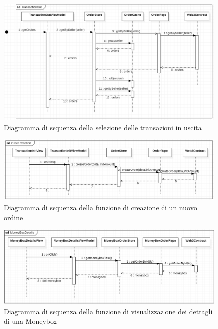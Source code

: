 \begin{landscape}
    \begin{figure}[H]
        \begin{center}
        \includegraphics[scale=0.7]{immagini/TransactionOut.png}
        \caption{Diagramma di sequenza della selezione delle transazioni in uscita}
        \end{center}
    \end{figure}
\end{landscape}

\begin{figure}[H]
    \begin{center}
    \includegraphics[width=\textwidth]{immagini/ordercreation.png}
    \caption{Diagramma di sequenza della funzione di creazione di un nuovo ordine}
    \end{center}
\end{figure}

\begin{figure}[H]
    \begin{center}
    \includegraphics[width=\textwidth]{immagini/moneyboxdetails.png}
    \caption{Diagramma di sequenza della funzione di visualizzazione dei dettagli di una Moneybox}
    \end{center}
\end{figure}

